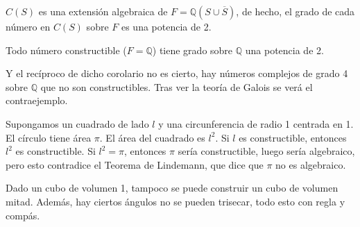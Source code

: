 \begin{coro}
    $C(S)$ es una extensión algebraica de $F=\mathbb{Q}(S\cup \overline{S})$, de hecho, el grado de cada número en $C(S)$ sobre $F$ es una potencia de 2. 
\end{coro}

\begin{coro}
    Todo número constructible ($F=\mathbb{Q}$) tiene grado sobre $\mathbb{Q}$ una potencia de 2.
\end{coro}

Y el recíproco de dicho corolario no es cierto, hay números complejos de grado 4 sobre $\mathbb{Q}$ que no son constructibles. Tras ver la teoría de Galois se verá el contraejemplo.

\begin{ejemplo}
    Supongamos un cuadrado de lado $l$ y una circunferencia de radio 1 centrada en 1. El círculo tiene área $\pi$. El área del cuadrado es $l^2$. Si $l$ es constructible, entonces $l^2$ es constructible. Si $l^2=\pi$, entonces $\pi$ sería constructible, luego sería algebraico, pero esto contradice el Teorema de Lindemann, que dice que $\pi$ no es algebraico.
\end{ejemplo}

\noindent
Dado un cubo de volumen 1, tampoco se puede construir un cubo de volumen mitad. Además, hay ciertos ángulos no se pueden trisecar, todo esto con regla y compás.

